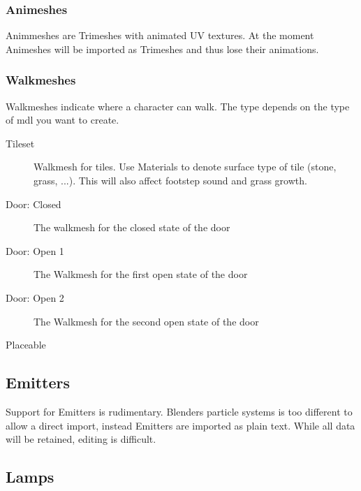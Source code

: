 \subsubsection{Animeshes}
Animmeshes are Trimeshes with animated UV textures. At the moment Animeshes
will be imported as Trimeshes and thus lose their animations.

\subsubsection{Walkmeshes}
Walkmeshes indicate where a character can walk. The type depends on the type
of mdl you want to create.
\begin{description}
    \item[Tileset] Walkmesh for tiles. Use Materials to denote surface type of
                   tile (stone, grass, ...). This will also affect footstep
                   sound and grass growth.
    \item[Door: Closed] The walkmesh for the closed state of the door
    \item[Door: Open 1] The Walkmesh for the first open state of the door
    \item[Door: Open 2] The Walkmesh for the second open state of the door
    \item[Placeable]
\end{description}

\subsection{Emitters}
Support for Emitters is rudimentary. Blenders particle systems is too
different to allow a direct import, instead Emitters are imported as plain
text. While all data will be retained, editing is difficult.

\subsection{Lamps}
